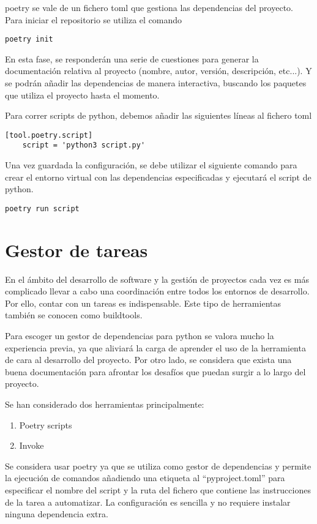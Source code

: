 \gls{poetry} se vale de un fichero \gls{toml} que gestiona las \glspl{dependencia} del proyecto. Para iniciar el \gls{repositorio} se utiliza el comando
\begin{lstlisting}[style=consola]
	poetry init
\end{lstlisting}

En esta fase, se responderán una serie de cuestiones para generar la documentación relativa al proyecto (nombre, autor, versión, descripción, etc...). Y se podrán añadir las \glspl{dependencia} de manera interactiva, buscando los paquetes que utiliza el proyecto hasta el momento.

Para correr \glspl{script} de \gls{python}, debemos añadir las siguientes líneas al fichero \gls{toml}
\begin{lstlisting}[style=consola]
	[tool.poetry.script]
	script = 'python3 script.py'
\end{lstlisting}

Una vez guardada la configuración, se debe utilizar el siguiente comando para crear el entorno virtual con las \glspl{dependencia} especificadas y ejecutará el \gls{script} de \gls{python}. 
\begin{lstlisting}[style=consola]
	poetry run script
\end{lstlisting}

\section{Gestor de tareas}
En el ámbito del desarrollo de software y la gestión de proyectos cada vez es más complicado llevar a cabo una coordinación entre todos los entornos de desarrollo. Por ello, contar con un \gls{tareas} es indispensable. Este tipo de herramientas también se conocen como \gls{buildtools}. 

Para escoger un gestor de dependencias para \Gls{python} se valora mucho la experiencia previa, ya que aliviará la carga de aprender el uso de la herramienta de cara al desarrollo del proyecto. Por otro lado, se considera que exista una buena documentación para afrontar los desafíos que puedan surgir a lo largo del proyecto. 

Se han considerado dos herramientas principalmente: 
\begin{enumerate}
	\item Poetry scripts
	\item Invoke
\end{enumerate}

Se considera usar \gls{poetry} ya que se utiliza como gestor de dependencias y permite la ejecución de comandos añadiendo una etiqueta al ``pyproject.toml'' para especificar el nombre del script y la ruta del fichero que contiene las instrucciones de la tarea a automatizar. La configuración es sencilla y no requiere instalar ninguna dependencia extra.


